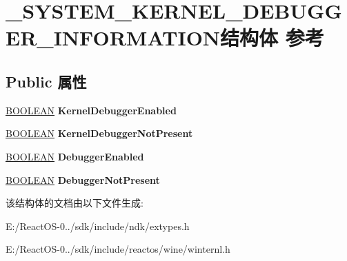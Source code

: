 \hypertarget{struct___s_y_s_t_e_m___k_e_r_n_e_l___d_e_b_u_g_g_e_r___i_n_f_o_r_m_a_t_i_o_n}{}\section{\+\_\+\+S\+Y\+S\+T\+E\+M\+\_\+\+K\+E\+R\+N\+E\+L\+\_\+\+D\+E\+B\+U\+G\+G\+E\+R\+\_\+\+I\+N\+F\+O\+R\+M\+A\+T\+I\+O\+N结构体 参考}
\label{struct___s_y_s_t_e_m___k_e_r_n_e_l___d_e_b_u_g_g_e_r___i_n_f_o_r_m_a_t_i_o_n}
\subsection*{Public 属性}
\begin{DoxyCompactItemize}
\item 
\mbox{\label{struct___s_y_s_t_e_m___k_e_r_n_e_l___d_e_b_u_g_g_e_r___i_n_f_o_r_m_a_t_i_o_n_aa683207cfdc562c0c908aa18d8ac9ca9}} 
\hyperlink{_processor_bind_8h_a112e3146cb38b6ee95e64d85842e380a}{B\+O\+O\+L\+E\+AN} {\bfseries Kernel\+Debugger\+Enabled}
\item 
\mbox{\label{struct___s_y_s_t_e_m___k_e_r_n_e_l___d_e_b_u_g_g_e_r___i_n_f_o_r_m_a_t_i_o_n_a3da18d359f988e936b23e4aebb03c952}} 
\hyperlink{_processor_bind_8h_a112e3146cb38b6ee95e64d85842e380a}{B\+O\+O\+L\+E\+AN} {\bfseries Kernel\+Debugger\+Not\+Present}
\item 
\mbox{\label{struct___s_y_s_t_e_m___k_e_r_n_e_l___d_e_b_u_g_g_e_r___i_n_f_o_r_m_a_t_i_o_n_ad5e70b5b4c11add12883ec44d318f837}} 
\hyperlink{_processor_bind_8h_a112e3146cb38b6ee95e64d85842e380a}{B\+O\+O\+L\+E\+AN} {\bfseries Debugger\+Enabled}
\item 
\mbox{\label{struct___s_y_s_t_e_m___k_e_r_n_e_l___d_e_b_u_g_g_e_r___i_n_f_o_r_m_a_t_i_o_n_a6bfb2d21c6fa840f6da525d375e8d8c3}} 
\hyperlink{_processor_bind_8h_a112e3146cb38b6ee95e64d85842e380a}{B\+O\+O\+L\+E\+AN} {\bfseries Debugger\+Not\+Present}
\end{DoxyCompactItemize}


该结构体的文档由以下文件生成\+:\begin{DoxyCompactItemize}
\item 
E\+:/\+React\+O\+S-\/0../sdk/include/ndk/extypes.\+h\item 
E\+:/\+React\+O\+S-\/0../sdk/include/reactos/wine/winternl.\+h\end{DoxyCompactItemize}
